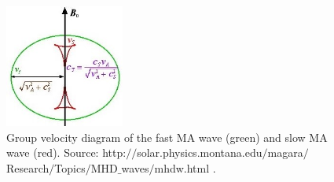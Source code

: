 \documentclass[12pt,a4paper,twoside]{article}
\begin{document}
\begin{figure}[h]
\centering
\includegraphics[width = 0.35\textwidth]{dispersion_g}
\caption{Group velocity diagram of the fast MA wave (green) and slow MA wave (red). Source: http:$/ /$solar.physics.montana.edu$/$magara$/$Research$/$Topics$/$MHD$\_$waves$/$mhdw.html .}\label{fig_15} 
\end{figure}
\newpage
\end{document}
